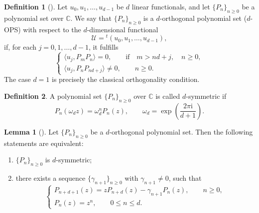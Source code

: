 \documentclass[preprint,3p,10pt]{elsarticle}
\theoremstyle{definition}
\newtheorem{definition}{Definition}[section]
\newtheorem{lemma}{Lemma}[section]
\begin{document}
\begin{definition}[\cite{VanIseghem1987,Maroni1989}]
Let \(u_0,u_1,\ldots,u_{d-1}\) be \(d\) linear functionals, and let
\(\{P_n\}_{n\geq 0}\) be a polynomial set over $\mathbb{C}$. We say that
\(\{P_n\}_{n\geq 0}\) is a \(d\)-orthogonal polynomial set (\(d\)-OPS) with respect to the $d$-dimensional functional
\begin{equation}
    \mathcal U={}^{t}(u_0,u_1,\ldots,u_{d-1}),
\end{equation}
if, for each \(j=0,1,\ldots,d-1\), it fulfills
\begin{equation}
\begin{cases}
    \langle u_j, P_m P_n\rangle=0,
    \qquad \text{if} \quad m>nd+j,\quad n\geq 0,\\
    \langle u_j, P_n P_{nd+j}\rangle\neq 0,
    \qquad n\geq 0.
\end{cases} 
\end{equation}
The case \(d=1\) is precisely the classical orthogonality condition.
\end{definition}

\begin{definition}
    A polynomial set \(\{P_n\}_{n\geq 0}\) over $\mathbb{C}$ is called \(d\)-symmetric if
\begin{equation}
    P_n(\omega_d z)=\omega_d^n P_n(z), 
    \qquad
    \omega_d=\exp\left(\frac{2\pi \mathrm{i}}{d+1}\right).
\end{equation}
\end{definition}

\begin{lemma}[{\cite{DouakMaroni1992,romdhane2008zeros}}] \label{lem:d-symmetric-recurrence} 
Let \(\{P_n\}_{n\geq 0}\) be a \(d\)-orthogonal polynomial set. Then the following statements are equivalent: 
\begin{enumerate} 
\item[(a)] \(\{P_n\}_{n\geq 0}\) is \(d\)-symmetric; 
\item[(b)] there exists a sequence \(\{\gamma_{n+1}\}_{n\geq 0}\)  with \(\gamma_{n+1}\neq 0\), such that 
\begin{equation} \label{eqn:d-sym-d-othognal,recurrence relations}
\begin{cases} P_{n+d+1}(z)=z P_{n+d}(z)-\gamma_{n+1}P_n(z), \qquad n\geq 0,\\ 
P_n(z)=z^n, \qquad 0\leq n\leq d. 
\end{cases} 
\end{equation} 
\end{enumerate} 
\end{lemma} 
\end{document}
